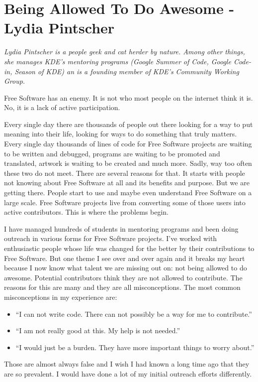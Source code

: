 \chapter{Being Allowed To Do Awesome - Lydia Pintscher}

\textit{Lydia Pintscher is a people geek and cat herder by nature. Among other things, she manages KDE's mentoring programs (Google Summer of Code, Google Code-in, Season of KDE) an is a founding member of KDE's Community Working Group.}

Free Software has an enemy. It is not who most people on the internet think it is. No, it is a lack of active participation.

Every single day there are thousands of people out there looking for a way to put meaning into their life, looking for ways to do something that truly matters. Every single day thousands of lines of code for Free Software projects are waiting to be written and debugged, programs are waiting to be promoted and translated, artwork is waiting to be created and much more. Sadly, way too often these two do not meet. There are several reasons for that. It starts with people not knowing about Free Software at all and its benefits and purpose. But we are getting there. People start to use and maybe even understand Free Software on a large scale. Free Software projects live from converting some of those users into active contributors. This is where the problems begin.

I have managed hundreds of students in mentoring programs and been doing outreach in various forms for Free Software projects. I've worked with enthusiastic people whose life was changed for the better by their contributions to Free Software. But one theme I see over and over again and it breaks my heart because I now know what talent we are missing out on: not being allowed to do awesome. Potential contributors think they are not allowed to contribute. The reasons for this are many and they are all misconceptions. The most common misconceptions in my experience are:
\begin{itemize}
 \item ``I can not write code. There can not possibly be a way for me to contribute.''
 \item ``I am not really good at this. My help is not needed.''
 \item ``I would just be a burden. They have more important things to worry about.''
\end{itemize}
Those are almost always false and I wish I had known a long time ago that they are so prevalent. I would have done a lot of my initial outreach efforts differently.
